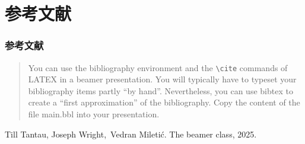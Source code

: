 \documentclass[
aspectratio=169,%
]{beamer}
\begin{document}
\section{参考文献}

\begin{frame}\frametitle{参考文献}
    \begin{quote}
        You can use the bibliography environment and the \texttt{\textbackslash cite} commands of LATEX in a beamer presentation. You will typically have to typeset your bibliography items partly ``by hand''. Nevertheless, you can use bibtex to create a ``first approximation'' of the bibliography. Copy the content of the file main.bbl into your presentation.
        \cite{beamer-user-guide}
    \end{quote}

    \begin{thebibliography}{1}

    Till Tantau{,} Joseph Wright{,}~Vedran Miletić.
    \newblock The beamer class, 2025.

    \end{thebibliography}
\end{frame}
\end{document}
